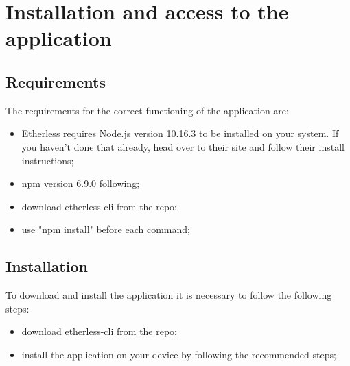 \section{Installation and access to the application}
\subsection{Requirements}
The requirements for the correct functioning of the application are:
\begin{itemize}
	\item Etherless requires Node.js version 10.16.3 to be installed on your system. If you haven’t done that already, head over to their site and follow their install instructions;
	\item npm version 6.9.0 following;
	\item  download etherless-cli from the repo;
	\item  use "npm install" before each command;

\end{itemize}
\subsection{Installation}
To download and install the application it is necessary to follow the following steps:
\begin{itemize}
	\item download etherless-cli from the repo;
	\item install the application on your device by following the recommended steps;
\end{itemize}